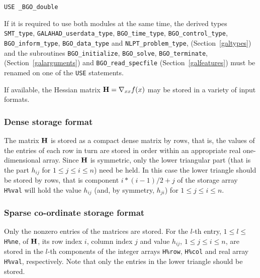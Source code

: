 \documentclass{galahad}
\newcommand{\packagename}{BGO}
\newcommand{\fullpackagename}{\libraryname\_\packagename}
\begin{document}
\hspace{8mm} {\tt USE  \fullpackagename\_double}

\medskip

\noindent
If it is required to use both modules at the same time, the derived types
{\tt SMT\_type},
{\tt GALAHAD\_userdata\_type},
{\tt \packagename\_time\_\-type},
{\tt \packagename\_control\_type},
{\tt \packagename\_inform\_type},
{\tt \packagename\_data\_type}
and
{\tt NLPT\_problem\_type},
(Section~\ref{galtypes})
and the subroutines
{\tt \packagename\_initialize},
{\tt \packagename\_\-solve},
{\tt \packagename\_terminate},
(Section~\ref{galarguments})
and
{\tt \packagename\_read\_specfile}
(Section~\ref{galfeatures})
must be renamed on one of the {\tt USE} statements.


\galmatrix
If available, the Hessian matrix ${\mathbf{H}} = \nabla_{xx} f(x)$
may be stored in a variety of input formats.

\subsubsection{Dense storage format}\label{dense}
The matrix ${\mathbf{H}}$ is stored as a compact
dense matrix by rows, that is, the values of the entries of each row in turn are
stored in order within an appropriate real one-dimensional array.
Since ${\mathbf{H}}$ is symmetric, only the lower triangular part (that is the part
$h_{ij}$ for $1 \leq j \leq i \leq n$) need be held. In this case
the lower triangle should be stored by rows, that is
component $i \ast (i-1)/2 + j$ of the storage array {\tt H\%val}
will hold the value $h_{ij}$ (and, by symmetry, $h_{ji}$)
for $1 \leq j \leq i \leq n$.

\subsubsection{Sparse co-ordinate storage format}\label{coordinate}
Only the nonzero entries of the matrices are stored.
For the $l$-th entry, $1 \leq l \leq$ {\tt H\%ne}, of ${\mathbf{H}}$, 
its row index $i$, column index $j$ and value $h_{ij}$,
$1 \leq j \leq i \leq n$,
are stored in the $l$-th components of the integer arrays {\tt H\%row},
{\tt H\%col} and real array {\tt H\%val}, respectively.
Note that only the entries in the lower triangle should be stored.
\end{document}
